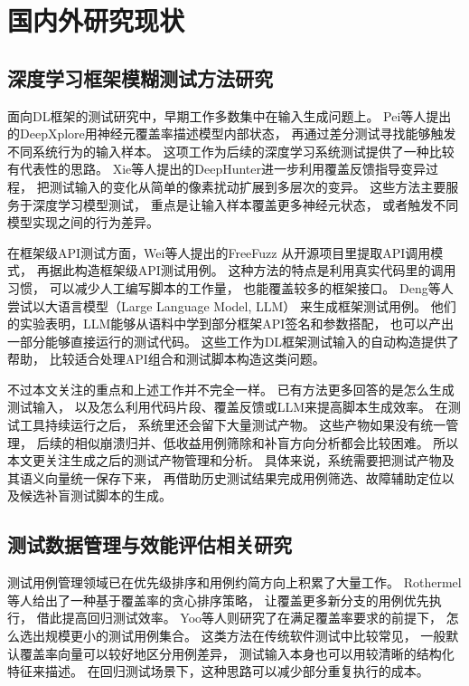 \section{国内外研究现状}

\subsection{深度学习框架模糊测试方法研究}

面向DL框架的测试研究中，早期工作多数集中在输入生成问题上。
Pei等人提出的DeepXplore\cite{ref_deepxplore}用神经元覆盖率描述模型内部状态，
再通过差分测试寻找能够触发不同系统行为的输入样本。
这项工作为后续的深度学习系统测试提供了一种比较有代表性的思路。
Xie等人\cite{ref_deephunter}提出的DeepHunter进一步利用覆盖反馈指导变异过程，
把测试输入的变化从简单的像素扰动扩展到多层次的变异。
这些方法主要服务于深度学习模型测试，
重点是让输入样本覆盖更多神经元状态，
或者触发不同模型实现之间的行为差异。

在框架级API测试方面，Wei等人提出的FreeFuzz\cite{ref_freefuzz}
从开源项目里提取API调用模式，
再据此构造框架级API测试用例。
这种方法的特点是利用真实代码里的调用习惯，
可以减少人工编写脚本的工作量，
也能覆盖较多的框架接口。
Deng等人\cite{ref_titanfuzz}尝试以大语言模型（Large Language Model, LLM）
来生成框架测试用例。
他们的实验表明，LLM能够从语料中学到部分框架API签名和参数搭配，
也可以产出一部分能够直接运行的测试代码。
这些工作为DL框架测试输入的自动构造提供了帮助，
比较适合处理API组合和测试脚本构造这类问题。

不过本文关注的重点和上述工作并不完全一样。
已有方法更多回答的是怎么生成测试输入，
以及怎么利用代码片段、覆盖反馈或LLM来提高脚本生成效率。
在测试工具持续运行之后，
系统里还会留下大量测试产物。
这些产物如果没有统一管理，
后续的相似崩溃归并、低收益用例筛除和补盲方向分析都会比较困难。
所以本文更关注生成之后的测试产物管理和分析。
具体来说，系统需要把测试产物及其语义向量统一保存下来，
再借助历史测试结果完成用例筛选、故障辅助定位以及候选补盲测试脚本的生成。

\subsection{测试数据管理与效能评估相关研究}

测试用例管理领域已在优先级排序和用例约简方向上积累了大量工作。
Rothermel等人\cite{ref_tcp}给出了一种基于覆盖率的贪心排序策略，
让覆盖更多新分支的用例优先执行，
借此提高回归测试效率。
Yoo等人\cite{ref_tsm}则研究了在满足覆盖率要求的前提下，
怎么选出规模更小的测试用例集合。
这类方法在传统软件测试中比较常见，
一般默认覆盖率向量可以较好地区分用例差异，
测试输入本身也可以用较清晰的结构化特征来描述。
在回归测试场景下，这种思路可以减少部分重复执行的成本。

